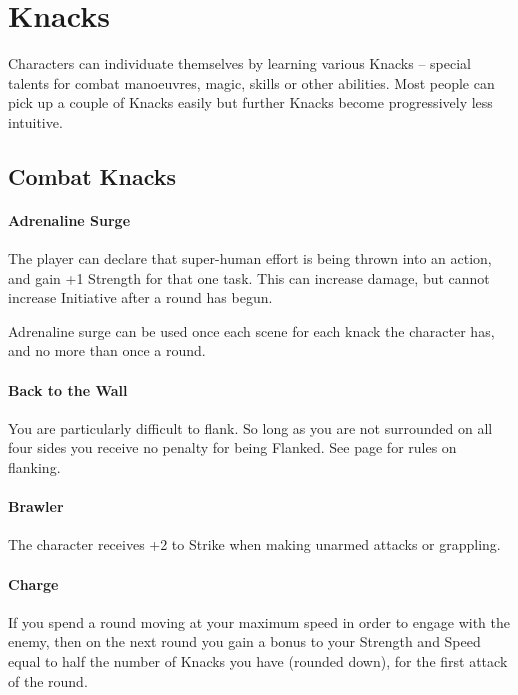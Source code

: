 \chapter{Knacks}\label{knacks}

Characters can individuate themselves by learning various Knacks -- special talents for combat manoeuvres, magic, skills or other abilities.
Most people can pick up a couple of Knacks easily but further Knacks become progressively less intuitive.

\section{Combat Knacks}

\begin{multicols}{2}

\subsubsection{Adrenaline Surge}

The player can declare that super-human effort is being thrown into an action, and gain +1 Strength for that one task.  This can increase damage, but cannot increase Initiative after a \gls{round} has begun.

Adrenaline surge can be used once each scene for each knack the character has, and no more than once a \gls{round}.

\subsubsection{Back to the Wall}

You are particularly difficult to flank. So long as you are not surrounded on all four sides you receive no penalty for being Flanked.
See page \pageref{flank} for rules on flanking.

\subsubsection{Brawler}

The character receives +2 to Strike when making unarmed attacks or grappling.

\subsubsection{Charge}

If you spend a \gls{round} moving at your maximum speed in order to engage with the enemy, then on the next round you gain a bonus to your Strength and Speed equal to half the number of Knacks you have (rounded down), for the first attack of the round.


\end{multicols}
